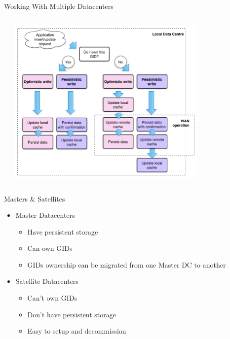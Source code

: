 \documentclass[aspectratio=169]{beamer}
\begin{document}
\begin{frame}{Working With Multiple Datacenters}
    \begin{columns}
        \begin{column}[c]{0.1\textwidth}
        \end{column}
        \begin{column}[c]{0.8\textwidth}
            \includegraphics[width=0.8\textwidth]{images/multidcops.png}
        \end{column}
        \begin{column}[c]{0.1\textwidth}
        \end{column}
    \end{columns}
\end{frame}

\begin{frame}{Masters \& Satellites}
    \begin{itemize}
        \item Master Datacenters
            \begin{itemize}
                \item Have persistent storage
                \item Can own GIDs
                \item GIDs ownership can be migrated from one Master DC to another
            \end{itemize}
        \pause
        \item Satellite Datacenters
            \begin{itemize}
                \item Can't own GIDs
                \item Don't have persistent storage
                \item Easy to setup and decommission
            \end{itemize}
    \end{itemize}
\end{frame}
\end{document}
